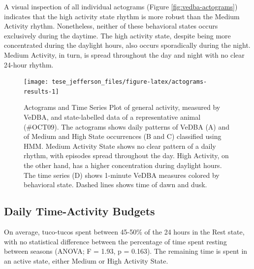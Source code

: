 \documentclass[msc,numbers,hidelinks]{coppe}
\begin{document}
  A visual inspection of all individual actograms (Figure \ref{fig:vedba-actograms}) indicates that the high activity state rhythm is more robust than the Medium Activity rhythm. Nonetheless, neither of these behavioral states occurs exclusively during the daytime. The high activity state, despite being more concentrated during the daylight hours, also occurs sporadically during the night. Medium Activity, in turn, is spread throughout the day and night with no clear 24-hour rhythm.
  \newline
  \begin{figure}[H]

  {\centering \texttt{[image: tese\_jefferson\_files/figure-latex/actograms-results-1]} 

  }

  \caption{Actograms and Time Series Plot of general activity, measured by VeDBA, and state-labelled data of a representative animal (\#OCT09). The actograms shows daily patterns of VeDBA (A) and of Medium and High State occurrences (B and C) classified using HMM. Medium Activity State shows no clear pattern of a daily rhythm, with episodes spread throughout the day. High Activity, on the other hand, has a higher concentration during daylight hours. The time series (D) shows 1-minute VeDBA measures colored by behavioral state. Dashed lines shows time of dawn and dusk.}\label{fig:actograms-results}
  \end{figure}
  \clearpage

  \hypertarget{daily-time-activity-budgets}{%
  \subsection{Daily Time-Activity Budgets}\label{daily-time-activity-budgets}}

  On average, tuco-tucos spent between 45-50\% of the 24 hours in the Rest state, with no statistical difference between the percentage of time spent resting between seasons (ANOVA; F = 1.93, p = 0.163). The remaining time is spent in an active state, either Medium or High Activity State.
\end{document}
